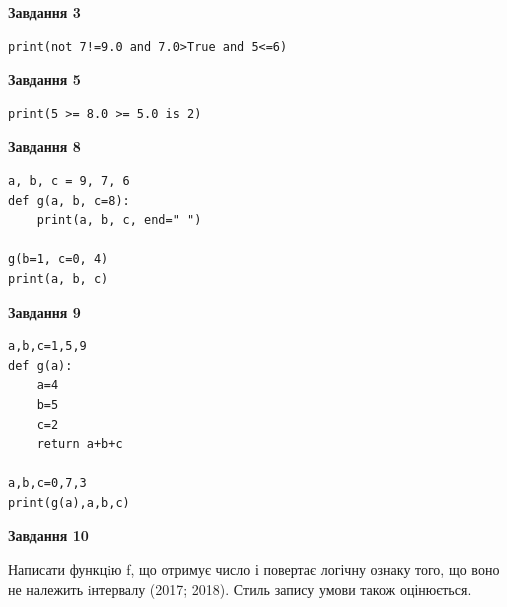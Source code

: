 \documentclass[12pt, ukrainian]{article}
\begin{document}
{\begin {large}
\begin{minipage}[t]{7.5cm}
\end{minipage}
\vline \hspace{6mm}
\begin{minipage}[t]{10.5cm}

\begin{center}
\textbf{Завдання 3}
\end{center}

\begin{verbatim}
print(not 7!=9.0 and 7.0>True and 5<=6)
\end{verbatim}



\begin{center}
\textbf{Завдання 5}
\end{center}

\begin{verbatim}
print(5 >= 8.0 >= 5.0 is 2)
\end{verbatim}



\begin{center}
\textbf{Завдання 8}
\end{center}

\begin{verbatim}
a, b, c = 9, 7, 6
def g(a, b, c=8):
    print(a, b, c, end=" ")

g(b=1, c=0, 4)
print(a, b, c)
\end{verbatim}



\begin{center}
\textbf{Завдання 9}
\end{center}

\begin{verbatim}
a,b,c=1,5,9
def g(a):
    a=4
    b=5
    c=2
    return a+b+c

a,b,c=0,7,3
print(g(a),a,b,c)
\end{verbatim}



\begin{center}
\textbf{Завдання 10}
\end{center}

Написати функцiю f, що отримує число і повертає логічну ознаку того, що воно не належить iнтервалу (2017; 2018). Стиль запису умови також оцінюється.\par

\end{minipage}

\end {large}}
\newpage
\end{document}
